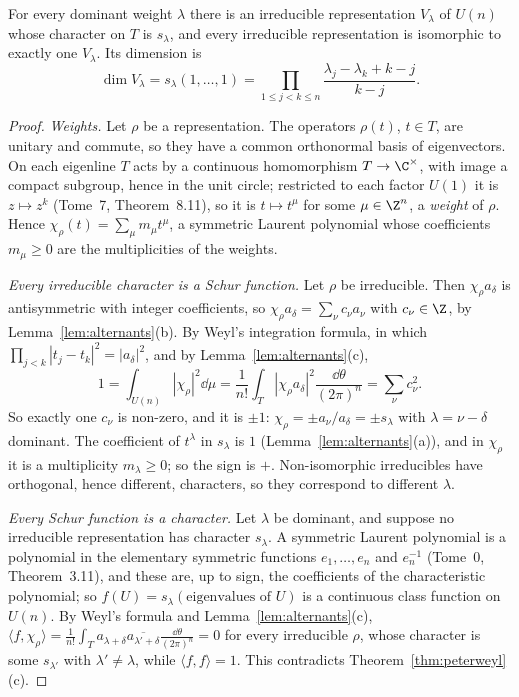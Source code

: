 \begin{theorem}\label{thm:weylchar}
For every dominant weight $\lambda$ there is an irreducible representation $V_\lambda$ of $U(n)$ whose character on $T$ is $s_\lambda$, and every irreducible representation is isomorphic to exactly one $V_\lambda$. Its dimension is
\[
\dim V_\lambda=s_\lambda(1,\dots,1)=\prod_{1\le j<k\le n}\frac{\lambda_j-\lambda_k+k-j}{k-j}.
\]
\end{theorem}

\begin{proof}
\emph{Weights.} Let $\rho$ be a representation. The operators $\rho(t)$, $t\in T$, are unitary and commute, so they have a common orthonormal basis of eigenvectors. On each eigenline $T$ acts by a continuous homomorphism $T\to\C^\times$, with image a compact subgroup, hence in
the unit circle; restricted to each factor $U(1)$ it is $z\mapsto z^{k}$ (Tome~7, Theorem~8.11), so it is $t\mapsto t^\mu$ for some $\mu\in\Z^n$, a \emph{weight} of $\rho$. Hence $\chi_\rho(t)=\sum_\mu m_\mu t^\mu$, a symmetric Laurent polynomial whose
coefficients $m_\mu\ge0$ are the multiplicities of the weights.

\emph{Every irreducible character is a Schur function.} Let $\rho$ be irreducible. Then $\chi_\rho a_\delta$ is antisymmetric with integer coefficients, so $\chi_\rho a_\delta=\sum_\nu c_\nu a_\nu$ with $c_\nu\in\Z$, by Lemma~\ref{lem:alternants}(b). By Weyl's integration formula,
in which $\prod_{j<k}|t_j-t_k|^2=|a_\delta|^2$, and by Lemma~\ref{lem:alternants}(c),
\[
1=\int_{U(n)}|\chi_\rho|^2\dd\mu=\frac1{n!}\int_T|\chi_\rho a_\delta|^2\frac{\dd\theta}{(2\pi)^n}=\sum_\nu c_\nu^2.
\]
So exactly one $c_\nu$ is non-zero, and it is $\pm1$: $\chi_\rho=\pm a_\nu/a_\delta=\pm s_\lambda$ with $\lambda=\nu-\delta$ dominant. The coefficient of $t^\lambda$ in $s_\lambda$ is $1$ (Lemma~\ref{lem:alternants}(a)), and in $\chi_\rho$ it is a multiplicity $m_\lambda\ge0$; so the sign is
$+$. Non-isomorphic irreducibles have orthogonal, hence different, characters, so they correspond to different $\lambda$.

\emph{Every Schur function is a character.} Let $\lambda$ be dominant, and suppose no irreducible representation has character $s_\lambda$. A symmetric Laurent polynomial is a polynomial in the elementary symmetric functions $e_1,\dots,e_n$ and $e_n^{-1}$
(Tome~0, Theorem~3.11), and these are, up to sign, the coefficients of the characteristic polynomial; so $f(U)=s_\lambda(\text{eigenvalues of }U)$ is a continuous class function on $U(n)$. By Weyl's formula and
Lemma~\ref{lem:alternants}(c), $\langle f,\chi_\rho\rangle=\frac1{n!}\int_Ta_{\lambda+\delta}\overline{a_{\lambda'+\delta}}\frac{\dd\theta}{(2\pi)^n}=0$ for every irreducible $\rho$, whose character is some $s_{\lambda'}$ with $\lambda'\ne\lambda$, while $\langle f,f\rangle=1$. This contradicts
Theorem~\ref{thm:peterweyl}(c).


\end{proof}
